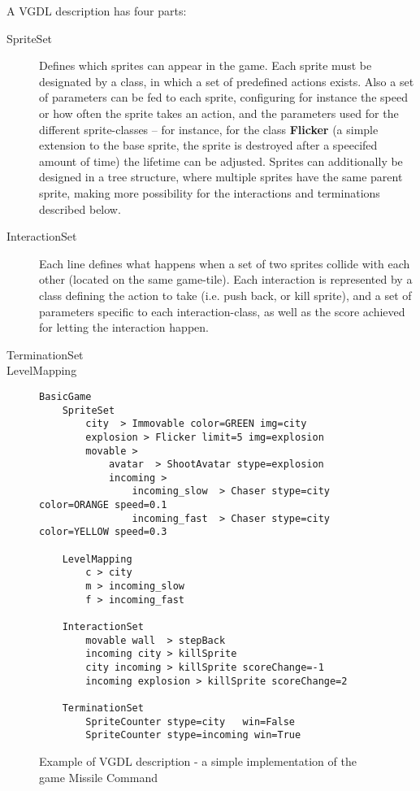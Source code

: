 \documentclass[a4paper,titlepage,final, twoside]{report}
\begin{document}
A VGDL description has four parts: 

\begin{description}
\item [SpriteSet] Defines which sprites can appear in the game. Each sprite must be designated by a class, in which a set of predefined actions exists. Also a set of parameters can be fed to each sprite, configuring for instance the speed or how often the sprite takes an action, and the parameters used for the different sprite-classes -- for instance, for the  class \textbf{Flicker} (a simple extension to the base sprite, the sprite is destroyed after a speecifed amount of time) the lifetime can be adjusted.
Sprites can additionally be designed in a tree structure, where multiple sprites have the same parent sprite, making more possibility for the interactions and terminations described below. 
\item [InteractionSet] Each line defines what happens when a set of two sprites collide with each other (located on the same game-tile). Each interaction is represented by a class defining the action to take (i.e. push back, or kill sprite), and a set of parameters specific to each interaction-class, as well as the score achieved for letting the interaction happen.
\item [TerminationSet]
\item [LevelMapping]
\end{description}


\begin{figure}[!ht]
\centering
\begin{lstlisting}
BasicGame
	SpriteSet
		city  > Immovable color=GREEN img=city
		explosion > Flicker limit=5 img=explosion
		movable >
			avatar  > ShootAvatar stype=explosion
			incoming >
				incoming_slow  > Chaser stype=city color=ORANGE speed=0.1
				incoming_fast  > Chaser stype=city color=YELLOW speed=0.3

	LevelMapping
		c > city
		m > incoming_slow
		f > incoming_fast
		
	InteractionSet
		movable wall  > stepBack
		incoming city > killSprite
		city incoming > killSprite scoreChange=-1
		incoming explosion > killSprite scoreChange=2

	TerminationSet
		SpriteCounter stype=city   win=False
		SpriteCounter stype=incoming win=True
\end{lstlisting}
\caption{Example of VGDL description - a simple implementation of the game Missile Command}
\label{fig:vgdl}
\end{figure}
\end{document}
